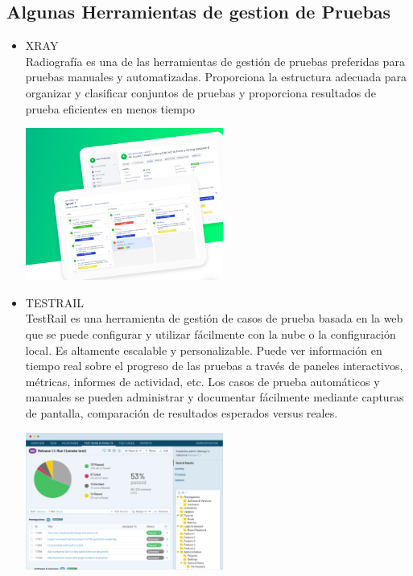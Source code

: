 \documentclass[twoside,twocolumn]{article}
\begin{document}
\subsection{Algunas Herramientas de gestion de Pruebas}
\begin{itemize}
    \item XRAY\\
Radiografía es una de las herramientas de gestión de pruebas preferidas para pruebas manuales y automatizadas. Proporciona la estructura adecuada para organizar y clasificar conjuntos de pruebas y proporciona resultados de prueba eficientes en menos tiempo\\
\begin{center}
	\includegraphics[width=6.5cm]{./imagenes/xray.png} 
	\end{center}
    \item TESTRAIL\\
TestRail es una herramienta de gestión de casos de prueba basada en la web que se puede configurar y utilizar fácilmente con la nube o la configuración local. Es altamente escalable y personalizable. Puede ver información en tiempo real sobre el progreso de las pruebas a través de paneles interactivos, métricas, informes de actividad, etc. Los casos de prueba automáticos y manuales se pueden administrar y documentar fácilmente mediante capturas de pantalla, comparación de resultados esperados versus reales.\\
\begin{center}
	\includegraphics[width=6.5cm]{./imagenes/testrail.png} 
	\end{center}

\end{itemize}
\end{document}
